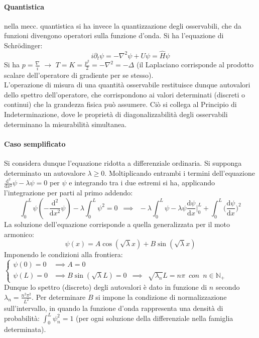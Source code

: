 \documentclass[10pt]{article}
\theoremstyle{plain}
\begin{document}
\paragraph{Quantistica} nella mecc. quantistica si ha invece la quantizzazione degli osservabili, che da funzioni divengono operatori sulla funzione d'onda. Si ha l'equazione di Schr\"odinger:
\[i \partial_t \psi = - \nabla^2 \psi + U \psi = \hat{H}\psi\]
Si ha $\displaystyle p = \frac{\nabla}{i}$ $\rightarrow$ $\displaystyle T = K = \frac{p^2}{2} = - \nabla^2 = - \Delta$ (il Laplaciano corrisponde al prodotto scalare dell'operatore di gradiente per se stesso).
\\L'operazione di misura di una quantità osservabile restituisce dunque autovalori dello spettro dell'operatore, che corrispondono ai valori determinati (discreti o continui) che la grandezza fisica può assumere. Ciò si collega al Principio di Indeterminazione, dove le proprietà di diagonalizzabilità degli osservabili determinano la misurabilità simultanea.

\paragraph{Caso semplificato}
Si considera dunque l'equazione ridotta a differenziale ordinaria. Si supponga determinato un autovalore $\lambda \geq 0$.
Moltiplicando entrambi i termini dell'equazione $\displaystyle \frac{\textrm{d}^2}{\textrm{d}x^2}\psi - \lambda \psi = 0$ per $\psi$ e integrando tra i due estremi si ha, applicando l'integrazione per parti al primo addendo:
\[\int_0^L \psi( - \frac{\textrm{d}^2}{\textrm{d}x^2}\psi) - \lambda \int_0^L \psi^2 = 0 \enspace \implies \enspace - \lambda \int_0^L \psi - \lambda \psi \frac{\textrm{d}\psi}{\textrm{d}x} \bigg|_0^L + \int_0^L \big(\frac{\textrm{d}\psi}{\textrm{d}x}\big)^2\]
La soluzione dell'equazione corrisponde a quella generalizzata per il moto armonico:
\[\psi(x) = A \cos(\sqrt{\lambda}x) + B \sin(\sqrt{\lambda}x)\]
Imponendo le condizioni alla frontiera: $\displaystyle \begin{cases}
    \psi(0) = 0 & \implies A = 0\\
    \psi(L) = 0 & \implies B \sin(\sqrt{\lambda}L) = 0 \enspace \implies \enspace \sqrt{\lambda_n}L = n \pi \enspace con \enspace n \in \mathbb{N}_+
\end{cases}$
\\Dunque lo spettro (discreto) degli autovalori è dato in funzione di $n$ secondo $\displaystyle \lambda_n = \frac{n^2 \pi^2}{L^2}$. Per determinare $B$ si impone la condizione di normalizzazione sull'intervallo, in quando la funzione d'onda rappresenta una densità di probabilità: $\displaystyle \int_0^L \psi_n^2 = 1$ (per ogni soluzione della differenziale nella famiglia determinata).
\end{document}

